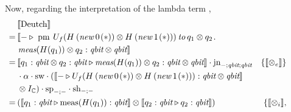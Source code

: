 Now, regarding the interpretation of the lambda term , 
\begin{align*}
  \hspace{-25pt} &  \llbracket  \text{Deutch}\rrbracket \\
  \hspace{-25pt} = \hspace{2pt} & \llbracket - \triangleright  \hspace{3pt} \text{pm} \hspace{4pt}  U_{f}(H  \hspace{2pt}   ( \textit{new}   \hspace{2pt}  0 \hspace{1pt}(*)) \otimes H  \hspace{2pt}   ( \textit{new}   \hspace{2pt}  1 \hspace{1pt}(*))) \hspace{2pt}  \textit{to} \hspace{2pt} q_{1} \otimes q_{2} \hspace{1pt}.   \\
  \hspace{-25pt}& \hspace{1pt}\textit{meas} (H( q_{1})) \otimes q_{2} : \textit{qbit} \otimes \textit{qbit}   \rrbracket \\
  \hspace{-25pt} =  \hspace{2pt}  & \llbracket q_1:\textit{qbit} \otimes q_2:\textit{qbit}  \triangleright \textit{meas} (H( q_{1})) \otimes q_{2} : \textit{qbit} \otimes \textit{qbit} \rrbracket \cdot \text{jn}_{-;\textit{qbit}; \textit{qbit}}   &  \{\llbracket  \otimes_ e \rrbracket\}     \\
  \hspace{-25pt}&   \cdot \alpha \cdot \text{sw}  \cdot ( \llbracket - \triangleright U_{f}(H  \hspace{2pt}  ( \textit{new}   \hspace{2pt}  0 \hspace{1pt}(*)) \otimes H  \hspace{2pt}   ( \textit{new}   \hspace{2pt}  1 \hspace{1pt}(*))): \textit{qbit} \otimes \textit{qbit}  \rrbracket \\
  \hspace{-25pt}& \otimes I_{\mathbb{C}})   \cdot \text{sp}_{-;-}  \cdot  \text{sh}_{-;-} \\ 
  \hspace{-25pt} =  \hspace{2pt}  & (\llbracket q_1:\textit{qbit}\triangleright \text{meas}(H(q_1)): \textit{qbit} \rrbracket \otimes \llbracket q_2:\textit{qbit} \triangleright q_2:\textit{qbit} \rrbracket)  &  \{\llbracket  \otimes_i \rrbracket,  \\

\end{align*}
